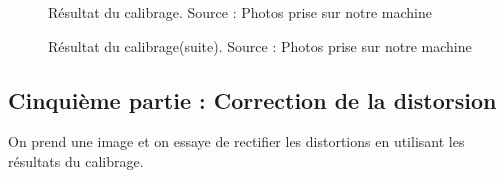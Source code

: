 \begin{figure}[H]%
	\center%
	\setlength{\fboxsep}{5pt}%
	\setlength{\fboxrule}{0.5pt}%
	\caption[Résultat du calibrage]{Résultat du calibrage. Source : Photos prise sur notre machine}
	\label{fig:Résultat du calibrage}
\end{figure}

\begin{figure}[H]%
	\center%
	\setlength{\fboxsep}{5pt}%
	\setlength{\fboxrule}{0.5pt}%
	\caption[Résultat du calibrage(suite)]{Résultat du calibrage(suite). Source : Photos prise sur notre machine}
	\label{fig:Résultat du calibrage(suite)}
\end{figure}

\subsection{Cinquième partie : Correction de la distorsion}

On prend une image et on essaye de rectifier les distortions en utilisant les résultats du calibrage.

